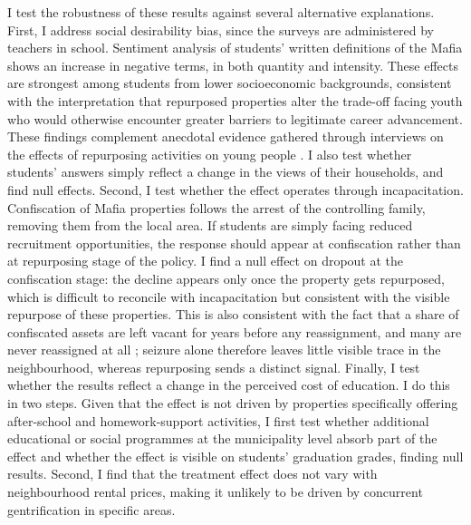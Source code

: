 \documentclass[12pt]{article}
\theoremstyle{plain}
\theoremstyle{plain}
\theoremstyle{plain}
\theoremstyle{definition}
\theoremstyle{plain}
\theoremstyle{definition}
\theoremstyle{plain}
\theoremstyle{remark}
\theoremstyle{definition}
\theoremstyle{definition}
\theoremstyle{plain}
\begin{document}
I test the robustness of these results against several alternative explanations. First, I address social desirability bias, since the surveys are administered by teachers in school. Sentiment analysis of students' written definitions of the Mafia shows an increase in negative terms, in both quantity and intensity. These effects are strongest among students from lower socioeconomic backgrounds, consistent with the interpretation that repurposed properties alter the trade-off facing youth who would otherwise encounter greater barriers to legitimate career advancement. These findings complement anecdotal evidence gathered through interviews on the effects of repurposing activities on young people \citep{nazzaro_il_2021, falcone_beneitalia_2016}. I also test whether students' answers simply reflect a change in the views of their households, and find null effects. Second, I test whether the effect operates through incapacitation. Confiscation of Mafia properties follows the arrest of the controlling family, removing them from the local area. If students are simply facing reduced recruitment opportunities, the response should appear at confiscation rather than at repurposing stage of the policy. I find a null effect on dropout at the confiscation stage: the decline appears only once the property gets repurposed, which is difficult to reconcile with incapacitation but consistent with the visible repurpose of these properties. This is also consistent with the fact that a share of confiscated assets are left vacant for years before any reassignment, and many are never reassigned at all \citep{falcone_beneitalia_2016}; seizure alone therefore leaves little visible trace in the neighbourhood, whereas repurposing sends a distinct signal.
Finally, I test whether the results reflect a change in the perceived cost of education. I do this in two steps. Given that the effect is not driven by properties specifically offering after-school and homework-support activities, I first test whether additional educational or social programmes at the municipality level absorb part of the effect and whether the effect is visible on students' graduation grades, finding null results. Second, I find that the treatment effect does not vary with neighbourhood rental prices, making it unlikely to be driven by concurrent gentrification in specific areas. \par
\medskip
\end{document}
